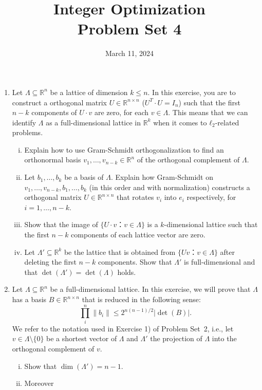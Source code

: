 \documentclass[11pt,a4paper]{article}
\title{Integer Optimization  \\ Problem Set 4 }
\date{ March 11, 2024}
\begin{document}
\maketitle 




\begin{enumerate}[1)]
\item Let $Λ ⊆ ℝ^n$ be a lattice of dimension $k≤n$. In this exercise, you are to construct a orthogonal matrix $U ∈ ℝ^{n × n}$  ($U^T ⋅U = I_n$) such that the first $n-k$ components of  $U ⋅ v$ are zero, for each $v ∈ Λ$. This means that we can identify $Λ$ as a full-dimensional lattice in $ℝ^k$ when it comes to $ℓ_2$-related problems. 

  \begin{enumerate}[i)] 
  \item Explain how to use Gram-Schmidt orthogonalization to find an
    orthonormal basis $v_1,\dots,v_{n-k}∈ ℝ^n$ of the orthogonal
    complement of $Λ$.
  \item Let $b_1,\dots,b_k$ be a basis of $Λ$. Explain how
    Gram-Schmidt on $v_1,\dots,v_{n-k},b_1,\dots,b_k$ (in this order
    and with normalization) constructs a orthogonal matrix
    $U ∈ ℝ^{ n ×n}$ that rotates $v_i$ into $e_i$ respectively, for
    $i=1,\dots,n-k$.
  \item Show that the image of $\{ U ⋅v ： v ∈ Λ\}$ is a $k$-dimensional lattice such that the first $n-k$ components of each lattice vector are zero.
  \item Let $Λ' ⊆ ℝ^k$ be the lattice that is obtained from $\{ U v ： v ∈ Λ\}$ after deleting the first $n-k$ components. Show that $Λ'$ is full-dimensional and that $\det(Λ') = \det(Λ)$ holds. 
  \end{enumerate}
\item Let $Λ⊆ℝ^n$ be a full-dimensional lattice. In this exercise, we will prove that $Λ$ has a basis $B ∈ℝ^{n ×n}$  that is reduced in the following sense:
  \begin{displaymath}
   ∏_i^n \|b_i\| ≤ 2^{n (n-1)/2}  |\det (B)|.
 \end{displaymath}
 We refer to the notation used in Exercise 1) of Problem Set~2, i.e., let $v ∈Λ \setminus \{0\}$ be a shortest vector of $Λ$ and $Λ'$ the projection of $Λ$ into the orthogonal complement of $v$.
 \begin{enumerate}[i)]
 \item Show that $\dim(Λ') = n-1$.
 \item Moreover 
   \begin{displaymath}

\end{displaymath}
\end{enumerate}
\end{enumerate}
\end{document}
